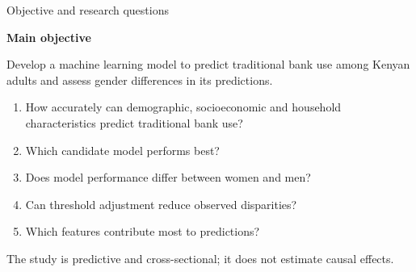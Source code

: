 \documentclass[aspectratio=169,10pt]{beamer}
\begin{document}
\begin{frame}{Objective and research questions}

\textbf{Main objective}

Develop a machine learning model to predict traditional bank use among Kenyan adults and assess gender differences in its predictions.

\vspace{.2cm}

\begin{enumerate}

    \item How accurately can demographic, socioeconomic and household characteristics predict traditional bank use?

    \item Which candidate model performs best?

    \item Does model performance differ between women and men?

    \item Can threshold adjustment reduce observed disparities?

    \item Which features contribute most to predictions?

\end{enumerate}

\vspace{.15cm}

{\footnotesize\color{Muted}
The study is predictive and cross-sectional; it does not estimate causal effects.
}

\end{frame}

\end{document}
